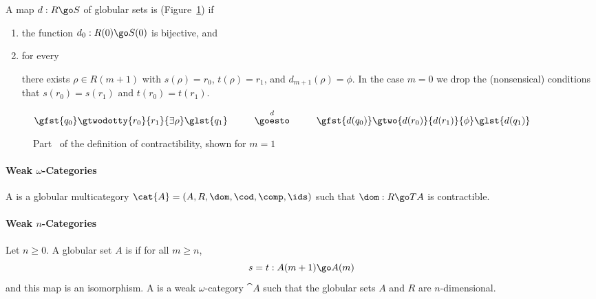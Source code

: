 A map $d: R \go S$ of globular sets is 
(Figure~\ref{fig:contr}) if
%
\begin{enumerate}
\item the function $d_0: R(0) \go S(0)$ is bijective, and
\item 	\label{part:major}
for every 
there exists $\rho \in R(m+1)$ with $s(\rho)=r_0$, $t(\rho)=r_1$, and
$d_{m+1}(\rho)=\phi$.  In the case $m=0$ we drop the (nonsensical) conditions
that $s(r_0)=s(r_1)$ and $t(r_0)=t(r_1)$.
\end{enumerate}

\begin{figure}
\begin{center}
$
\gfst{q_0}\gtwodotty{r_0}{r_1}{\exists\rho}\glst{q_1}
\mbox{\hspace{2.5em}}
\stackrel{d}{\goesto}
\mbox{\hspace{2.5em}}
\gfst{d(q_0)}\gtwo{d(r_0)}{d(r_1)}{\phi}\glst{d(q_1)}
$
\end{center}
\vspace*{-1em}
\caption{Part~ of the definition of contractibility, shown
for $m=1$}
\label{fig:contr}
\end{figure}


\paragraph{Weak $\omega$-Categories}

A  is a globular multicategory 
$\cat{A} = (A,R,\dom,\cod,\comp,\ids)$ such that $\dom: R \go TA$ is
contractible. 

\paragraph{Weak $n$-Categories}

Let $n\geq 0$.  A globular set $A$ is  if for all
$m\geq n$,
\[
s=t: A(m+1) \go A(m)
\]
and this map is an isomorphism.  A  is a weak
$\omega$-category $\cat{A}$ such that the globular sets $A$ and $R$ are
$n$-dimensional. 



